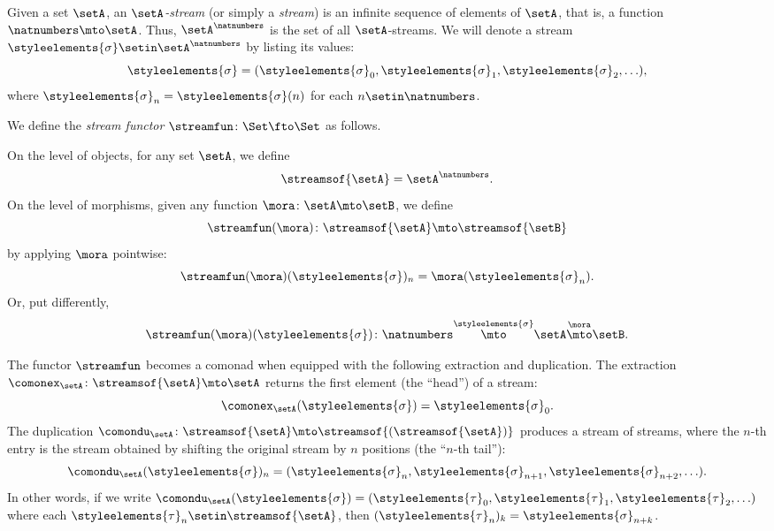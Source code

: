 \begin{example}
\label{exa:stream-comonad}

Given a set $\setA$, an \emph{$\setA$-stream} (or simply a \emph{stream}) is an infinite sequence of elements of $\setA$, that is, a function $\natnumbers \mto \setA$. Thus, $\setA^\natnumbers$ is the set of all $\setA$-streams. We will denote a stream $\styleelements{\sigma} \setin \setA^\natnumbers$ by listing its values:
\begin{equation}
    \styleelements{\sigma} = (\styleelements{\sigma}_0, \styleelements{\sigma}_1, \styleelements{\sigma}_2, \ldots),
\end{equation}
where $\styleelements{\sigma}_n = \styleelements{\sigma}(n)$ for each $n \setin \natnumbers$.

We define the \emph{stream functor} $\streamfun \colon \Set \fto \Set$ as follows.

On the level of objects, for any set $\setA$, we define
\begin{equation}
    \streamsof{\setA} = \setA^{\natnumbers}.
\end{equation}
On the level of morphisms, given any function $\mora \colon \setA \mto \setB$, we define 
\begin{equation}
\streamfun(\mora) \colon \streamsof{\setA} \mto \streamsof{\setB}
\end{equation}
 by applying $\mora$ pointwise:
 \begin{equation}
    \streamfun(\mora)(\styleelements{\sigma})_n = \mora(\styleelements{\sigma}_n).
\end{equation}
Or, put differently, 
\begin{equation}
    \streamfun(\mora)(\styleelements{\sigma}) \colon \natnumbers \overset{\styleelements{\sigma}}{\mto} \setA \overset{\mora}{\mto} \setB.
\end{equation}

The functor $\streamfun$ becomes a comonad when equipped with the following extraction and duplication. The extraction $\comonex_\setA \colon \streamsof{\setA} \mto \setA$ returns the first element (the ``head'') of a stream:
\begin{equation}\label{eq:stream-comonad-extraction}
    \comonex_\setA(\styleelements{\sigma}) = \styleelements{\sigma}_0.
\end{equation}
The duplication $\comondu_\setA \colon \streamsof{\setA} \mto \streamsof{(\streamsof{\setA})}$ produces a stream of streams, where the $n$-th entry is the stream obtained by shifting the original stream by $n$ positions (the ``$n$-th tail''):
\begin{equation}\label{eq:stream-comonad-duplication}
    \comondu_\setA(\styleelements{\sigma})_n = (\styleelements{\sigma}_{n}, \styleelements{\sigma}_{n+1}, \styleelements{\sigma}_{n+2}, \ldots).
\end{equation}
In other words, if we write $\comondu_\setA(\styleelements{\sigma}) = (\styleelements{\tau}_0, \styleelements{\tau}_1, \styleelements{\tau}_2, \ldots)$ where each $\styleelements{\tau}_n \setin \streamsof{\setA}$, then $(\styleelements{\tau}_n)_k = \styleelements{\sigma}_{n+k}$.

\end{example}

